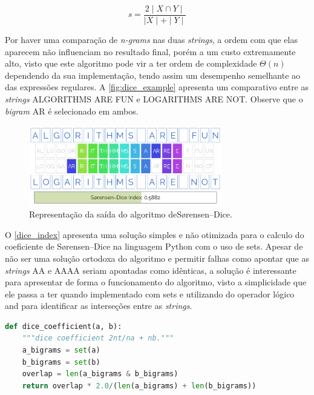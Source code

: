 \begin{equation}\label{dice_equation}
  s = \frac{2\mid X\cap Y\mid}{\mid X\mid+\mid Y\mid}
\end{equation}

Por haver uma comparação de \textit{n-grams} nas duas \textit{strings}, a ordem com que elas aparecem não influenciam no resultado final, porém  a um custo extremamente alto, visto que este algoritmo pode vir a ter ordem de complexidade $\Theta(n)$ dependendo da sua implementação, tendo assim um desempenho semelhante ao das expressões regulares. A \autoref{fig:dice_example} apresenta um comparativo entre as \textit{strings} {\code ALGORITHMS ARE FUN} e {\code LOGARITHMS ARE NOT}. Observe que o \textit{bigram} {\code AR} é selecionado em ambos.

\begin{figure}[h]
  \centering
  \includegraphics[width=0.75\textwidth]{figuras/dice}
  \caption{Representação da saída do algoritmo deSørensen–Dice\protect\footnotemark.}
  \label{fig:dice_example}
\end{figure}

O \autoref{dice_index} apresenta uma solução simples e não otimizada para o calculo do coeficiente de Sørensen–Dice na linguagem Python com o uso de {\code sets}. Apesar de não ser uma solução ortodoxa do algoritmo e permitir falhas como apontar que as \textit{strings} {\code AA} e {\code AAAA} seriam apontadas como idênticas, a solução é interessante para apresentar de forma o funcionamento do algoritmo, visto a simplicidade que ele passa a ter quando implementado com {\code sets} e utilizando do operador lógico {\code and} para identificar as interseções entre as \textit{strings}.

\begin{lstlisting}[language=Python,label=dice_index,caption={Simples implementação do coeficiente de Sørensen–Dice}]
def dice_coefficient(a, b):
    """dice coefficient 2nt/na + nb."""
    a_bigrams = set(a)
    b_bigrams = set(b)
    overlap = len(a_bigrams & b_bigrams)
    return overlap * 2.0/(len(a_bigrams) + len(b_bigrams))
\end{lstlisting}


